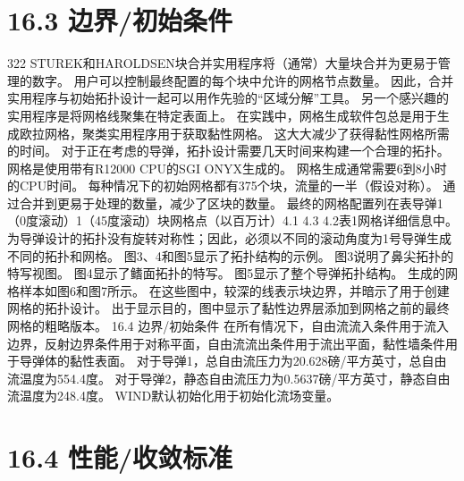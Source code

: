 \documentclass[UTF8,11pt,a4paper,openany,fontset=fandol]{ctexbook}
\begin{document}
\section{16.3 边界/初始条件}
322 STUREK和HAROLDSEN块合并实用程序将（通常）大量块合并为更易于管理的数字。 用户可以控制最终配置的每个块中允许的网格节点数量。 因此，合并实用程序与初始拓扑设计一起可以用作先验的“区域分解”工具。 另一个感兴趣的实用程序是将网格线聚集在特定表面上。 在实践中，网格生成软件包总是用于生成欧拉网格，聚类实用程序用于获取黏性网格。 这大大减少了获得黏性网格所需的时间。 对于正在考虑的导弹，拓扑设计需要几天时间来构建一个合理的拓扑。 网格是使用带有R12000 CPU的SGI ONYX生成的。 网格生成通常需要6到8小时的CPU时间。 每种情况下的初始网格都有375个块，流量的一半（假设对称）。 通过合并到更易于处理的数量，减少了区块的数量。 最终的网格配置列在表导弹1（0度滚动）1（45度滚动）块网格点（以百万计）4.1 4.3 4.2表1网格详细信息中。 为导弹设计的拓扑没有旋转对称性；因此，必须以不同的滚动角度为1号导弹生成不同的拓扑和网格。 图3、4和图5显示了拓扑结构的示例。 图3说明了鼻尖拓扑的特写视图。 图4显示了鳍面拓扑的特写。 图5显示了整个导弹拓扑结构。 生成的网格样本如图6和图7所示。 在这些图中，较深的线表示块边界，并暗示了用于创建网格的拓扑设计。 出于显示目的，图中显示了黏性边界层添加到网格之前的最终网格的粗略版本。 16.4 边界/初始条件 在所有情况下，自由流流入条件用于流入边界，反射边界条件用于对称平面，自由流流出条件用于流出平面，黏性墙条件用于导弹体的黏性表面。 对于导弹1，总自由流压力为20.628磅/平方英寸，总自由流温度为554.4度。 对于导弹2，静态自由流压力为0.5637磅/平方英寸，静态自由流温度为248.4度。 WIND默认初始化用于初始化流场变量。

\section{16.4 性能/收敛标准}
\end{document}
